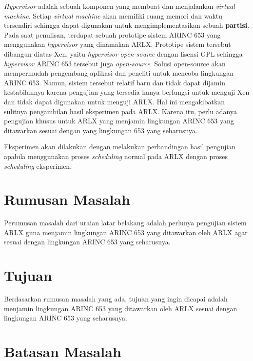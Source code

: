 \textit{Hypervisor} adalah sebuah komponen yang membuat dan menjalankan \textit{virtual machine}.
Setiap \textit{virtual machine} akan memiliki ruang memori dan waktu tersendiri sehingga dapat digunakan untuk mengimplementasikan sebuah \textbf{partisi}.
Pada saat penulisan, terdapat sebuah prototipe sistem ARINC 653 yang menggunakan \textit{hypervisor} yang dinamakan ARLX.
Prototipe sistem tersebut dibangun diatas Xen, yaitu \textit{hypervisor} \textit{open-source} dengan lisensi GPL sehingga \textit{hypervisor} ARINC 653 tersebut juga \textit{open-source}.
Solusi open-source akan mempermudah pengembang aplikasi dan peneliti untuk mencoba lingkungan ARINC 653.
Namun, sistem tersebut relatif baru dan tidak dapat dijamin kestabilannya karena pengujian yang tersedia hanya berfungsi untuk menguji Xen dan tidak dapat digunakan untuk menguji ARLX.
Hal ini mengakibatkan sulitnya pengambilan hasil eksperimen pada ARLX.
Karena itu, perlu adanya pengujian khusus untuk ARLX yang menjamin lingkungan ARINC 653 yang ditawarkan sesuai dengan yang lingkungan 653 yang seharusnya.


Eksperimen akan dilakukan dengan melakukan perbandingan hasil pengujian apabila menggunakan proses \textit{scheduling} normal pada ARLX dengan proses \textit{scheduling} eksperimen.


\section{Rumusan Masalah}

Perumusan masalah dari uraian latar belakang adalah perlunya pengujian sistem ARLX guna menjamin lingkungan ARINC 653 yang ditawarkan oleh ARLX agar sesuai dengan lingkungan ARINC 653 yang seharusnya.


\section{Tujuan}

Berdasarkan rumusan masalah yang ada, tujuan yang ingin dicapai adalah menjamin lingkungan ARINC 653 yang ditawarkan oleh ARLX sesuai dengan lingkungan ARINC 653 yang seharusnya.


\section{Batasan Masalah}
\label{section:batasan_masalah}

